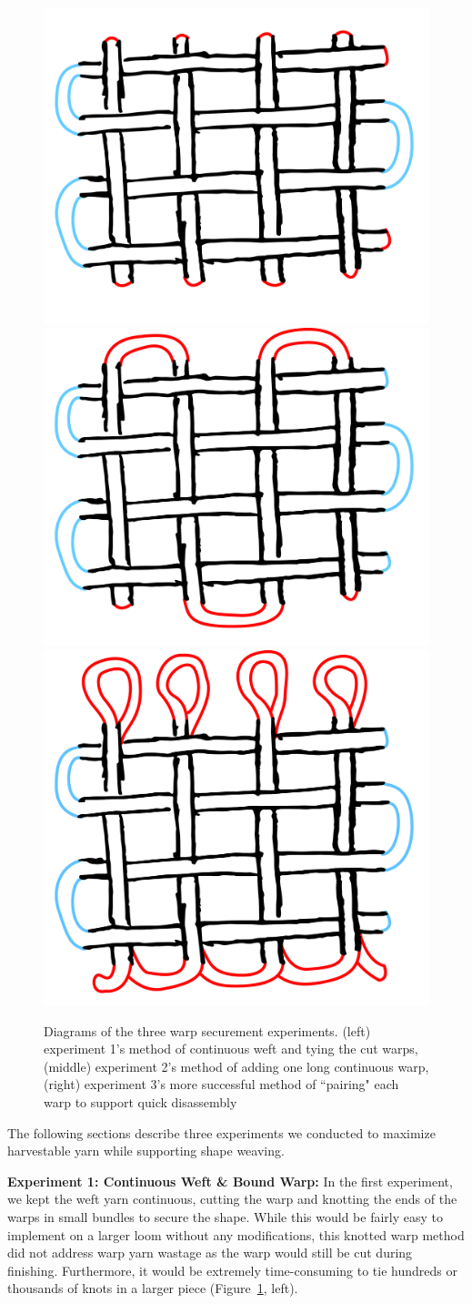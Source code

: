 \begin{figure}[ht]
    \centering
    \includegraphics[width=0.3\linewidth]{figs/UF_weave_contweft.pdf}
    \includegraphics[width=0.3\linewidth]{figs/UF_weave_contweftwarp.pdf}
    \includegraphics[width=0.3\linewidth]{figs/UF_weave_contweftwarp2.pdf}
    \caption[Unravel-able weaving experiments.]{Diagrams of the three warp securement experiments. (left) experiment 1's method of continuous weft and tying the cut warps, (middle) experiment 2's method of adding one long continuous warp, (right) experiment 3's more successful method of ``pairing" each warp to support quick disassembly}
    \label{fig:warpDiagrams}
\end{figure}

The following sections describe three experiments we conducted to maximize harvestable yarn while supporting shape weaving.

\textbf{Experiment 1: Continuous Weft \& Bound Warp:} In the first experiment, we  kept the weft yarn continuous, cutting the warp and knotting the ends of the warps in small bundles to secure the shape. While this would be fairly easy to implement on a larger loom without any modifications, this knotted warp method did not address warp yarn wastage as the warp would still be cut during finishing. Furthermore, it would be extremely time-consuming to tie hundreds or thousands of knots in a larger piece (Figure~\ref{fig:warpDiagrams}, left).

